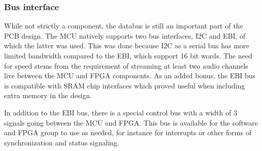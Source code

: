 \subsubsection{Bus interface}

While not strictly a component, the databus is still an important part of the
PCB design. The MCU natively supports two bus interfaces, I2C and EBI, of which
the latter was used. This was done because I2C as a serial bus has more limited
bandwidth compared to the EBI, which support 16 bit words. The need for speed
stems from the requirement of streaming at least two audio channels live between
the MCU and FPGA components. As an added bonus, the EBI bus is compatible with
SRAM chip interfaces which proved useful when including extra memory in the
design.

In addition to the EBI bus, there is a special control bus with a width of 3
signals going between the MCU and FPGA. This bus is available for the software
and FPGA group to use as needed, for instance for interrupts or other forms of
synchronization and status signaling.
